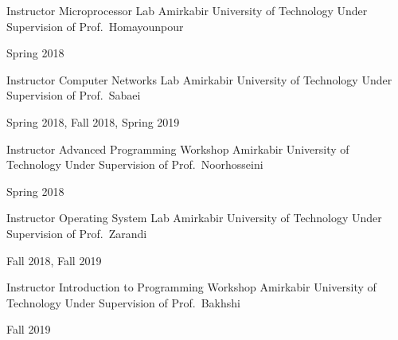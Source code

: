 \begin{cventries}
  \cventry
    {Instructor} %
    {Microprocessor Lab} %
    {Amirkabir University of Technology} %
    {Under Supervision of Prof.\ Homayounpour} %
    {
      \begin{cvitems} %
        Spring 2018
      \end{cvitems}
    }

  \cventry
    {Instructor} %
    {Computer Networks Lab} %
    {Amirkabir University of Technology} %
    {Under Supervision of Prof.\ Sabaei} %
    {
      \begin{cvitems} %
        Spring 2018, Fall 2018, Spring 2019
      \end{cvitems}
    }

  \cventry
    {Instructor} %
    {Advanced Programming Workshop} %
    {Amirkabir University of Technology} %
    {Under Supervision of Prof.\ Noorhosseini} %
    {
      \begin{cvitems} %
        Spring 2018
      \end{cvitems}
    }

  \cventry
    {Instructor} %
    {Operating System Lab} %
    {Amirkabir University of Technology} %
    {Under Supervision of Prof.\ Zarandi} %
    {
      \begin{cvitems} %
        Fall 2018, Fall 2019
      \end{cvitems}
    }

  \cventry
    {Instructor} %
    {Introduction to Programming Workshop} %
    {Amirkabir University of Technology} %
    {Under Supervision of Prof.\ Bakhshi} %
    {
      \begin{cvitems} %
        Fall 2019
      \end{cvitems}
    }

\end{cventries}
